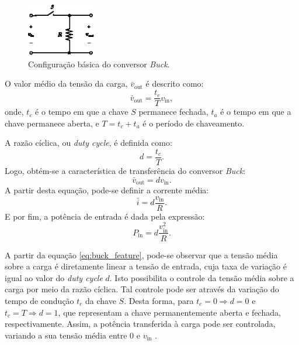 \begin{figure}[H]
  \centering
  \includegraphics[width=0.27\textwidth]{figuras/basic_buck_conversor.eps}
  \caption{Configuração básica do conversor \textit{Buck}.}
  \label{fig:basic-buck-converter}
\end{figure}

O valor médio da tensão da carga, $\bar{v}_{\mathrm{out}}$ é descrito como: \begin{equation} \bar{v}_{\mathrm{out}} = \frac{t_c}{T}v_{\mathrm{in}}, \end{equation} onde, $t_c$ é o tempo em que a chave $S$ permanece fechada, $t_a$ é o tempo em que a chave permanece aberta, e $T = t_c + t_a$ é o período de chaveamento. 

A razão cíclica, ou \textit{duty cycle}, é definida como: \begin{equation} d = \frac{t_c}{T}. \end{equation} Logo, obtém-se a característica de transferência do conversor \textit{Buck}: \begin{equation} \bar{v}_{\mathrm{out}} = dv_{\mathrm{in}}. \label{eq:buck_feature}\end{equation} A partir desta equação, pode-se definir a corrente média: \begin{equation} \bar{i} = d\frac{v_{\mathrm{in}}}{R}. \end{equation} E por fim, a potência de entrada é dada pela expressão: \begin{equation} P_{\mathrm{in}} = d \frac{v_{\mathrm{in}}^2}{R}. \end{equation}

A partir da equação \eqref{eq:buck_feature}, pode-se observar que a tensão média sobre a carga é diretamente linear a tensão de entrada, cuja taxa de variação é igual ao valor do \textit{duty cycle }$d$. Isto possibilita o controle da tensão média sobre a carga por meio da razão cíclica. Tal controle pode ser através da variação do tempo de condução $t_c$ da chave $S$. Desta forma, para $t_c = 0 \Rightarrow d = 0$ e $t_c = T \Rightarrow d = 1$, que representam a chave permanentemente aberta e fechada, respectivamente. Assim, a potência transferida à carga pode ser controlada, variando a sua tensão média entre 0 e $v_{\mathrm{in}}$ \citep{martins2008}.

